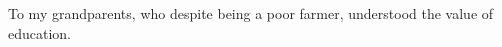 \vspace*{7cm}
\begin{center}
To my grandparents, who despite being a poor farmer, understood the value of education.
\end{center}
